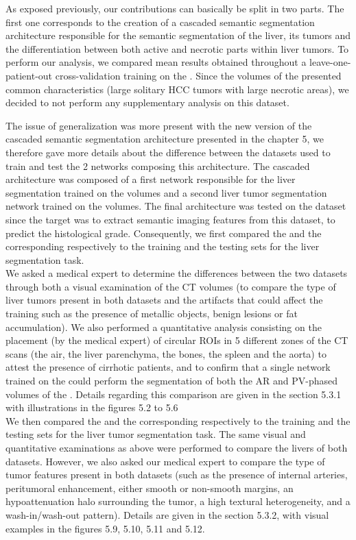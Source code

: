 \documentclass{article}
\begin{document}
\begin{itemize}
As exposed previously, our contributions can basically be split in two parts. The first one corresponds to the creation of a cascaded semantic segmentation architecture responsible for the semantic segmentation of the liver, its tumors and the differentiation between both active and necrotic parts within liver tumors.
To perform our analysis, we compared mean results obtained throughout a leave-one-patient-out cross-validation training on the . Since the volumes of the  presented common characteristics (large solitary HCC tumors with large necrotic areas), we decided to not perform any supplementary analysis on this dataset.

The issue of generalization was more present with the new version of the cascaded semantic segmentation architecture presented in the chapter 5, we therefore gave more details about the difference between the datasets used to train and test the 2 networks composing this architecture.
The cascaded architecture was composed of a first network responsible for the liver segmentation trained on the  volumes and a second liver tumor segmentation network trained on the  volumes. The final architecture was tested on the  dataset since the target was to extract semantic imaging features from this dataset, to predict the histological grade.
Consequently, we first compared the  and the  corresponding respectively to the training and the testing sets for the liver segmentation task.\\
We asked a medical expert to determine the differences between the two datasets through both a visual examination of the CT volumes (to compare the type of liver tumors present in both datasets and the artifacts that could affect the training such as the presence of metallic objects, benign lesions or fat accumulation). We also performed a quantitative analysis consisting on the placement (by the medical expert) of circular ROIs in 5 different zones of the CT scans (the air, the liver parenchyma, the bones, the spleen and the aorta) to attest the presence of cirrhotic patients, and to confirm that a single network trained on the  could perform the segmentation of both the AR and PV-phased volumes of the . Details regarding this comparison are given in the section 5.3.1 with illustrations in the figures 5.2 to 5.6 \\
We then compared the  and the  corresponding respectively to the training and the testing sets for the liver tumor segmentation task.
The same visual and quantitative examinations as above were performed to compare the livers of both datasets. However, we also asked our medical expert to compare the type of tumor features present in both datasets (such as the presence of internal arteries, peritumoral enhancement, either smooth or non-smooth margins, an hypoattenuation halo surrounding the tumor, a high textural heterogeneity, and a wash-in/wash-out pattern). Details are given in the section 5.3.2, with visual examples in the figures 5.9, 5.10, 5.11 and 5.12.\\


\end{itemize}
\end{document}
